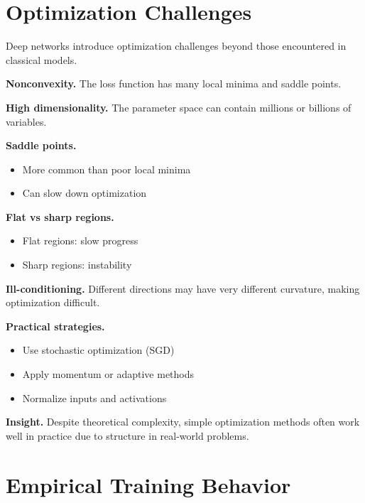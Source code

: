 \section{Optimization Challenges}

Deep networks introduce optimization challenges beyond those encountered in classical models.

\medskip

\noindent
\textbf{Nonconvexity.}  
The loss function has many local minima and saddle points.

\medskip

\noindent
\textbf{High dimensionality.}  
The parameter space can contain millions or billions of variables.

\medskip

\noindent
\textbf{Saddle points.}
\begin{itemize}
    \item More common than poor local minima
    \item Can slow down optimization
\end{itemize}

\medskip

\noindent
\textbf{Flat vs sharp regions.}
\begin{itemize}
    \item Flat regions: slow progress
    \item Sharp regions: instability
\end{itemize}

\medskip

\noindent
\textbf{Ill-conditioning.}  
Different directions may have very different curvature, making optimization difficult.

\medskip

\noindent
\textbf{Practical strategies.}
\begin{itemize}
    \item Use stochastic optimization (SGD)
    \item Apply momentum or adaptive methods
    \item Normalize inputs and activations
\end{itemize}

\medskip

\noindent
\textbf{Insight.}  
Despite theoretical complexity, simple optimization methods often work well in practice due to structure in real-world problems.

\section{Empirical Training Behavior}

